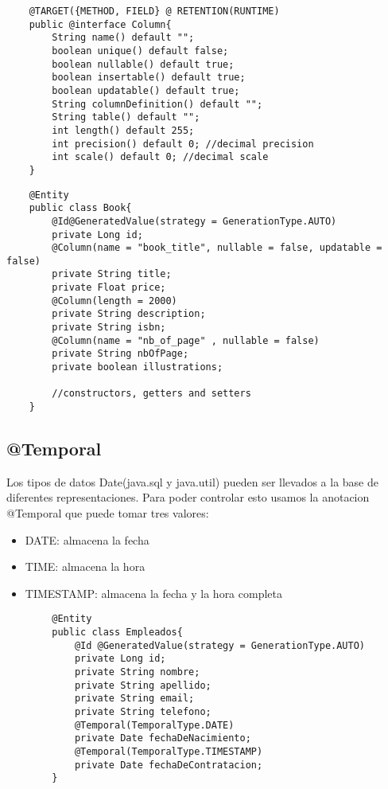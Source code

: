 \documentclass{article}
\begin{document}
\begin{lstlisting}
    @TARGET({METHOD, FIELD} @ RETENTION(RUNTIME)
    public @interface Column{
        String name() default "";
        boolean unique() default false;
        boolean nullable() default true;
        boolean insertable() default true;
        boolean updatable() default true;
        String columnDefinition() default "";
        String table() default "";
        int length() default 255;
        int precision() default 0; //decimal precision
        int scale() default 0; //decimal scale
    }
\end{lstlisting}

\begin{lstlisting}
    @Entity
    public class Book{
        @Id@GeneratedValue(strategy = GenerationType.AUTO)
        private Long id;
        @Column(name = "book_title", nullable = false, updatable = false)
        private String title;
        private Float price;
        @Column(length = 2000)
        private String description;
        private String isbn;
        @Column(name = "nb_of_page" , nullable = false)
        private String nbOfPage;
        private boolean illustrations;

        //constructors, getters and setters
    }
\end{lstlisting}

\subsection*{@Temporal}
Los tipos de datos Date(java.sql y java.util) pueden ser llevados a la base de diferentes representaciones. Para poder controlar esto usamos la anotacion @Temporal
que puede tomar tres valores:
\begin{itemize}
	\item DATE: almacena la fecha
	\item TIME: almacena la hora
	\item TIMESTAMP: almacena la fecha y la hora completa
\end{itemize}

\begin{lstlisting}
        @Entity 
        public class Empleados{
            @Id @GeneratedValue(strategy = GenerationType.AUTO)
            private Long id;
            private String nombre;
            private String apellido;
            private String email;
            private String telefono;
            @Temporal(TemporalType.DATE)
            private Date fechaDeNacimiento;
            @Temporal(TemporalType.TIMESTAMP)
            private Date fechaDeContratacion;
        }
    \end{lstlisting}
\end{document}
